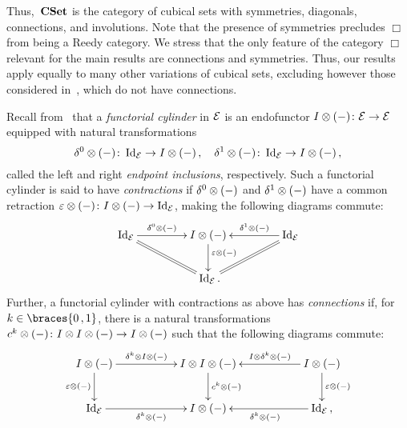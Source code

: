 \documentclass[reqno,10pt,a4paper,oneside,draft]{amsart}
\begin{document}
Thus,~$\mathbf{CSet}$ is the category of cubical sets with symmetries, diagonals, connections, and involutions.
Note that the presence of symmetries precludes $\Box$ from being a Reedy category.
We stress that the only feature of the category $\Box$ relevant for the main results are connections and symmetries.
Thus, our results apply equally to many other variations of cubical sets, excluding however those considered in~\cite{coquand-cubical-sets,huber-thesis}, which do not have connections.

Recall from~\cite{kamps-porter:homotopy} that a \emph{functorial cylinder} in $\mathcal{E}$ is an endofunctor $I \otimes (-) \colon \mathcal{E} \to \mathcal{E}$ equipped with natural transformations
\[
\delta^0 \otimes (-) \colon \operatorname{Id}_{\mathcal{E}} \to I \otimes (-)
\, , \quad
\delta^1 \otimes (-) \colon \operatorname{Id}_{\mathcal{E}} \to I \otimes (-)
\, ,\]
called the left and right \emph{endpoint inclusions}, respectively.
Such a functorial cylinder is said to have \emph{contractions} if $\delta^0 \otimes (-)$ and $\delta^1 \otimes (-)$ have a common retraction $\varepsilon \otimes (-) \colon I \otimes (-) \to \operatorname{Id}_{\mathcal{E}}$, making the following diagrams commute:
\begin{equation} \label{contractions}
\begin{gathered}
\xymatrix@C+2em{
  \Id_\catE
  \ar[r]^-{\lcyl \otimes (-)}
  \ar@{=}[dr]
&
  \interval \otimes (-)
  \ar[d]^(0.4){\ccyl \otimes (-)}
&
  \Id_\catE
  \ar[l]_-{\rcyl \otimes (-)}
  \ar@{=}[dl]
\\&
  \Id_\catE
\rlap{.}}
\end{gathered}
\end{equation}
Further, a functorial cylinder with contractions as above has \emph{connections} if, for $k \in \braces{0\,, 1}$, there is a natural transformations $c^k \otimes (-) \colon I \otimes I \otimes (-) \to I \otimes (-)$ such that the following diagrams commute:
\begin{equation} \label{connections:0}
\begin{gathered}
\xymatrix@C+3em{
  \interval \otimes (-)
  \ar[r]^-{\kcyl \otimes \interval \otimes (-)}
  \ar[d]_{\ccyl \otimes (-)}
&
  \interval \otimes \interval \otimes (-)
  \ar[d]^{c^k \otimes (-)}
&
  \interval \otimes (-)
  \ar[l]_-{\interval \otimes \kcyl \otimes (-)}
  \ar[d]^{\ccyl \otimes (-)}
\\
  \Id_\catE
  \ar[r]_{\kcyl \otimes (-)}
&
  \interval \otimes (-)
&
  \Id_\catE \, , 
  \ar[l]^{\kcyl \otimes (-)}
}
\end{gathered}
\end{equation}
\end{document}
